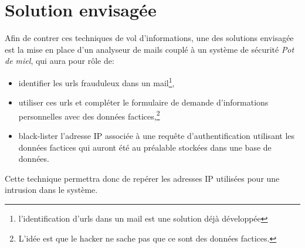 \section{Solution envisagée}
Afin de contrer ces techniques de vol d'informations, une des solutions 
envisagée est la mise
en place d'un analyseur de mails couplé à un système de sécurité 
\emph{Pot de miel}, qui aura pour rôle de:
\begin{itemize}
	\item identifier les urls frauduleux dans un mail\footnote{
			l'identification
			d'urls dans un mail est une solution déjà développée},
	\item utiliser ces urls et compléter le formulaire de demande
		d'informations personnelles 
		avec des données factices,\footnote{L'idée est que le hacker 
		ne sache pas que ce sont des données factices.}
	\item black-lister l'adresse IP associée à une requête 
		d'authentification utilisant les données factices qui auront 
		été  au préalable stockées
		dans une base de données.
\end{itemize}

Cette technique permettra donc de repérer les adresses IP utilisées pour une 
intrusion  dans le système.

